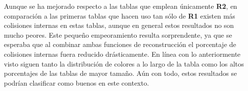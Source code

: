 \documentclass[12pt,spanish,listoffigures,listoftables,listofalgorithms]{tfgetsinf}
\begin{document}
\def\arraystretch{1.5}
\begin{table}[H]
	\centering
	\caption{Porcentajes de colisiones para las tablas empleando la concatenación de las funciones de reconstrucción}
	\label{colR1R2}
\end{table}

Aunque se ha mejorado respecto a las tablas que emplean únicamente \textbf{R2}, en comparación a las primeras tablas que hacen uso tan sólo de \textbf{R1} existen más colisiones internas en estas tablas, aunque en general estos resultados no son mucho peores. Este pequeño empeoramiento resulta sorprendente, ya que se esperaba que al combinar ambas funciones de reconstrucción el porcentaje de colisiones internas fuera reducido drásticamente. En línea con lo anteriormente visto siguen tanto la distribución de colores a lo largo de la tabla como los altos porcentajes de las tablas de mayor tamaño. Aún con todo, estos resultados se podrían clasificar como buenos en este contexto.
\end{document}
